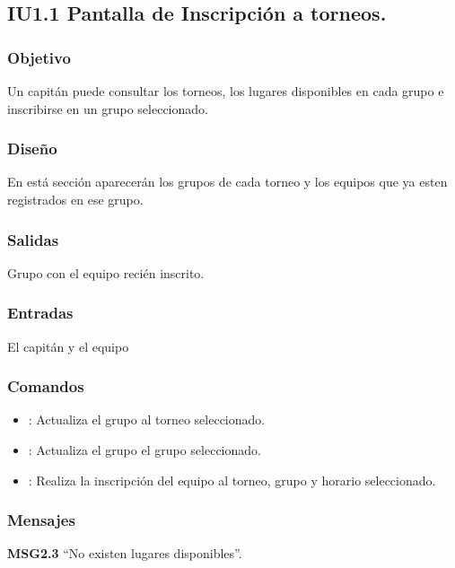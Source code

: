 
\subsection{IU1.1 Pantalla de Inscripción a torneos.}

\subsubsection{Objetivo}
	Un capitán puede consultar los torneos, los lugares disponibles en cada grupo e inscribirse en un grupo seleccionado.

\subsubsection{Diseño}
	En está sección aparecerán los grupos de cada torneo y los equipos que ya esten registrados en ese grupo.


\subsubsection{Salidas}

	Grupo con el equipo recién inscrito.

\subsubsection{Entradas}
	El capitán y el equipo

\subsubsection{Comandos}
\begin{itemize}
	\item {}: Actualiza el grupo al torneo seleccionado.
	\item {}: Actualiza el grupo el grupo seleccionado.
	\item {}: Realiza la inscripción del equipo al torneo, grupo y horario seleccionado.
\end{itemize}

\subsubsection{Mensajes}
	\begin{Citemize}
		\item {\bf MSG2.3 }``No existen lugares disponibles''.
	\end{Citemize}